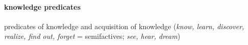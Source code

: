 \documentclass[a4,12pt]{scrartcl}
\begin{document}
\begin{exe}
\ex %

\ex %

\ex %

\ex %

\ex %

\ex %


\ex %


\end{exe}


\paragraph {\bf knowledge predicates} predicates of knowledge and acquisition of knowledge ({\it know, learn, discover, realize, find out, forget} = semifactives; {\it see, hear, dream})  \cite[3.2.5]{noonan2007}

\begin{exe}

\ex %

\ex %


\ex %

\ex %

\ex %

\ex %


\ex %

\ex %

\ex %


\end{exe}
\end{document}
